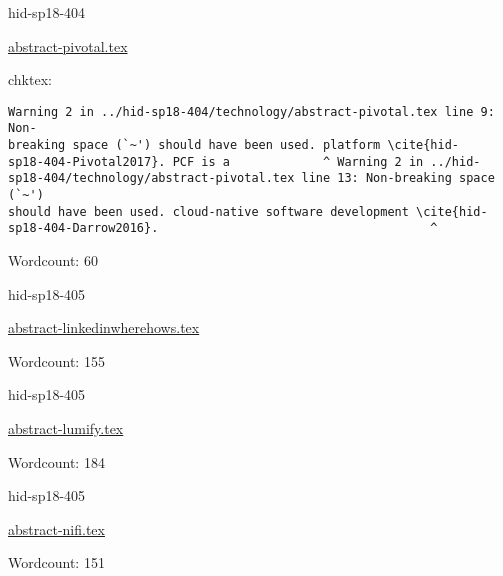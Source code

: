 

\begin{IU}

hid-sp18-404

\href{https://github.com/cloudmesh-community/hid-sp18-404/blob/master//technology/abstract-pivotal.tex}{abstract-pivotal.tex}

 
chktex:
\begin{tiny}
\begin{verbatim}
Warning 2 in ../hid-sp18-404/technology/abstract-pivotal.tex line 9: Non-
breaking space (`~') should have been used. platform \cite{hid-
sp18-404-Pivotal2017}. PCF is a             ^ Warning 2 in ../hid-
sp18-404/technology/abstract-pivotal.tex line 13: Non-breaking space (`~')
should have been used. cloud-native software development \cite{hid-
sp18-404-Darrow2016}.                                      ^
\end{verbatim}
\end{tiny}

Wordcount: 60

\end{IU}



\begin{IU}

hid-sp18-405

\href{https://github.com/cloudmesh-community/hid-sp18-405/blob/master//technology/abstract-linkedinwherehows.tex}{abstract-linkedinwherehows.tex}

 

Wordcount: 155

\end{IU}



\begin{IU}

hid-sp18-405

\href{https://github.com/cloudmesh-community/hid-sp18-405/blob/master//technology/abstract-lumify.tex}{abstract-lumify.tex}

 

Wordcount: 184

\end{IU}



\begin{IU}

hid-sp18-405

\href{https://github.com/cloudmesh-community/hid-sp18-405/blob/master//technology/abstract-nifi.tex}{abstract-nifi.tex}

 

Wordcount: 151

\end{IU}

